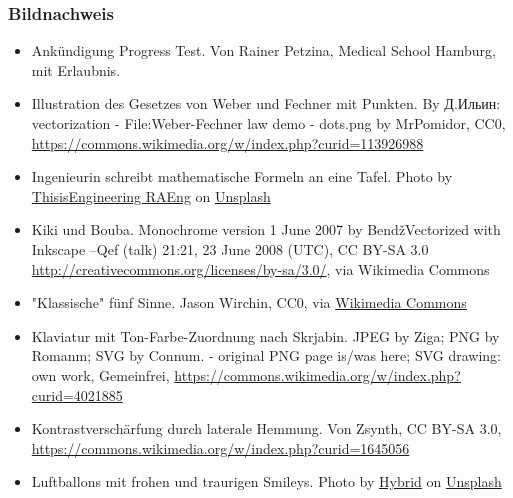 \documentclass[aspectratio=169]{beamer}
\begin{document}
\begin{frame}
\frametitle{Bildnachweis}
\begin{tiny}



 
\begin{itemize}

\item 
Ankündigung Progress Test. Von Rainer Petzina, Medical School Hamburg, mit Erlaubnis.
  
  
\item
Illustration des Gesetzes von Weber und Fechner mit Punkten. By Д.Ильин: vectorization - File:Weber-Fechner law demo - dots.png by MrPomidor, CC0, \url{https://commons.wikimedia.org/w/index.php?curid=113926988}
  
\item
Ingenieurin schreibt mathematische Formeln an eine Tafel. Photo by \href{https://unsplash.com/@thisisengineering?utm_source=unsplash&utm_medium=referral&utm_content=creditCopyText}{ThisisEngineering RAEng} on \href{https://unsplash.com/s/photos/formula?utm_source=unsplash&utm_medium=referral&utm_content=creditCopyText}{Unsplash}
  

\item
Kiki und Bouba.  Monochrome version 1 June 2007 by BendžVectorized with Inkscape --Qef (talk) 21:21, 23 June 2008 (UTC), CC BY-SA 3.0 \url{http://creativecommons.org/licenses/by-sa/3.0/}, via Wikimedia Commons
  
  
\item
"Klassische" fünf Sinne. Jason Wirchin, CC0, via \href{ https://commons.wikimedia.org/wiki/File:Five_Senses.jpg}{Wikimedia Commons}

\item
Klaviatur mit Ton-Farbe-Zuordnung nach Skrjabin. JPEG by Ziga; PNG by Romanm; SVG by Connum. - original PNG page is/was here; SVG drawing: own work, Gemeinfrei, \url{https://commons.wikimedia.org/w/index.php?curid=4021885}


\item

Kontrastverschärfung durch laterale Hemmung. Von Zsynth, CC BY-SA 3.0, \url{https://commons.wikimedia.org/w/index.php?curid=1645056 }

\item
Luftballons mit frohen und traurigen Smileys. Photo by \href{https://unsplash.com/@artbyhybrid?utm_source=unsplash&utm_medium=referral&utm_content=creditCopyText}{Hybrid} on \href{https://unsplash.com/s/photos/feedback?utm_source=unsplash&utm_medium=referral&utm_content=creditCopyText}{Unsplash}



\end{itemize}
\end{tiny}
\end{frame}
\end{document}

